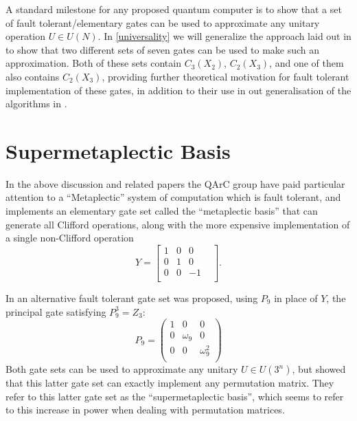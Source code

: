 A standard milestone for any proposed quantum computer is to show that a set of fault tolerant/elementary gates can be used to approximate any unitary operation $U \in U(N)$. In \autoref{universality} we will generalize the approach laid out in \cite{universal-qubit} to show that two different sets of seven gates can be used to make such an approximation. Both of these sets contain $C_3(X_2)$, $C_2(X_3)$, and one of them also contains $C_2(X_3)$, providing further theoretical motivation for fault tolerant implementation of these gates, in addition to their use in out generalisation of the algorithms in \cite{arithmetics}.

\section{Supermetaplectic Basis}\label{supermetaplectic}
In the above discussion and related papers the QArC group have paid particular attention to a ``Metaplectic'' system of computation which is fault tolerant, and implements an elementary gate set called the ``metaplectic basis'' that can generate all Clifford operations, along with the more expensive implementation of a single non-Clifford operation
\[Y = \begin{bmatrix}
1 & 0 & 0 & \\
0 & 1 & 0 & \\
0 & 0 & -1 & \\
\end{bmatrix}.\]

In \cite{arithmetics} an alternative fault tolerant gate set was proposed, using $P_9$ in place of $Y$, the principal gate satisfying $P_9^3 = Z_3$:
\[P_9 = \begin{pmatrix}
1 & 0 & 0 \\
0 & \omega_9 & 0 \\
0 & 0 & \omega_9^2 \\
\end{pmatrix}\]
Both gate sets can be used to approximate any unitary $U \in U(3^n)$, but \cite{arithmetics} showed that this latter gate set can exactly implement any permutation matrix. They refer to this latter gate set as the ``supermetaplectic basis'', which seems to refer to this increase in power when dealing with permutation matrices.

